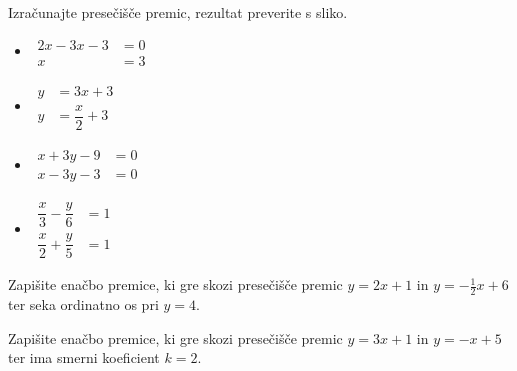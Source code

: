 ~\\~\\

            
            \begin{naloga}
                Izračunajte presečišče premic, rezultat preverite s sliko.
                \begin{multicols}{2}   
                \begin{itemize}
                        \item $\begin{aligned}
                            2x-3x-3&=0 \\ x&=3
                        \end{aligned}$ 
                        \item $\begin{aligned}
                            y&=3x+3 \\ y&=\dfrac{x}{2}+3
                        \end{aligned}$ 
                        \item $\begin{aligned}
                            x+3y-9&=0 \\ x-3y-3&=0
                        \end{aligned}$ 
                        \item $\begin{aligned}
                            \dfrac{x}{3}-\dfrac{y}{6}&=1 \\ \dfrac{x}{2}+\dfrac{y}{5}&=1
                        \end{aligned}$ 

                \end{itemize}
            \end{multicols}
            \end{naloga}
        


        
            
            \begin{naloga}
                Zapišite enačbo premice, ki gre skozi presečišče premic $y=2x+1$ in $y=-\frac{1}{2}x+6$ ter seka ordinatno os pri $y=4$.
            \end{naloga}

            \begin{naloga}
                Zapišite enačbo premice, ki gre skozi presečišče premic $y=3x+1$ in $y=-x+5$ ter ima smerni koeficient $k=2$.
            \end{naloga}

